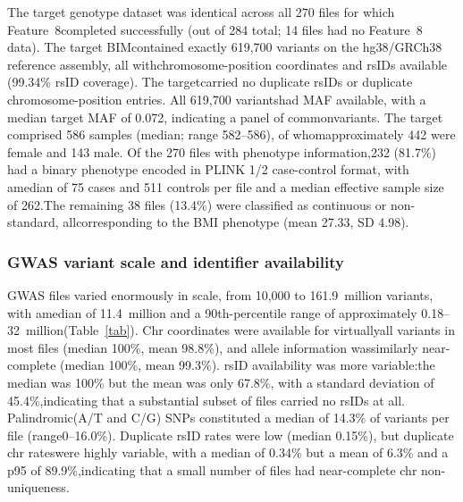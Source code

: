 \documentclass[11pt,a4paper]{article}
\begin{document}
The target genotype dataset was identical across all 270 files for which Feature~8completed successfully (out of 284 total; 14 files had no Feature~8 data). The target BIMcontained exactly 619,700 variants on the hg38/GRCh38 reference assembly, all withchromosome-position coordinates and rsIDs available (99.34\% rsID coverage). The targetcarried no duplicate rsIDs or duplicate chromosome-position entries. All 619,700 variantshad MAF available, with a median target MAF of 0.072, indicating a panel of commonvariants. The target comprised 586 samples (median; range 582--586), of whomapproximately 442 were female and 143 male. Of the 270 files with phenotype information,232 (81.7\%) had a binary phenotype encoded in PLINK 1/2 case-control format, with amedian of 75 cases and 511 controls per file and a median effective sample size of 262.The remaining 38 files (13.4\%) were classified as continuous or non-standard, allcorresponding to the BMI phenotype (mean 27.33, SD 4.98).

\subsubsection*{GWAS variant scale and identifier availability}

GWAS files varied enormously in scale, from 10,000 to 161.9~million variants, with amedian of 11.4~million and a 90th-percentile range of approximately 0.18--32~million(Table~\ref{tab}). Chr coordinates were available for virtuallyall variants in most files (median 100\%, mean 98.8\%), and allele information wassimilarly near-complete (median 100\%, mean 99.3\%). rsID availability was more variable:the median was 100\% but the mean was only 67.8\%, with a standard deviation of 45.4\%,indicating that a substantial subset of files carried no rsIDs at all. Palindromic(A/T and C/G) SNPs constituted a median of 14.3\% of variants per file (range0--16.0\%). Duplicate rsID rates were low (median 0.15\%), but duplicate chr rateswere highly variable, with a median of 0.34\% but a mean of 6.3\% and a p95 of 89.9\%,indicating that a small number of files had near-complete chr non-uniqueness.
\end{document}
